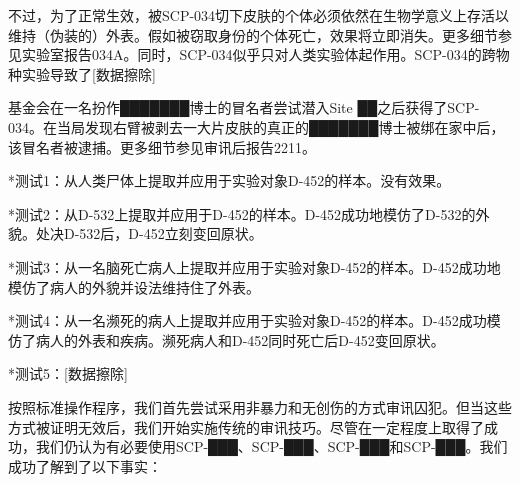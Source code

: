 不过，为了正常生效，被SCP-034切下皮肤的个体必须依然在生物学意义上存活以维持（伪装的）外表。假如被窃取身份的个体死亡，效果将立即消失。更多细节参见实验室报告034A。同时，SCP-034似乎只对人类实验体起作用。SCP-034的跨物种实验导致了{[}数据擦除]

基金会在一名扮作███████博士的冒名者尝试潜入Site ██之后获得了SCP-034。在当局发现右臂被剥去一大片皮肤的真正的███████博士被绑在家中后，该冒名者被逮捕。更多细节参见审讯后报告2211。


*测试1：从人类尸体上提取并应用于实验对象D-452的样本。没有效果。

*测试2：从D-532上提取并应用于D-452的样本。D-452成功地模仿了D-532的外貌。处决D-532后，D-452立刻变回原状。

*测试3：从一名脑死亡病人上提取并应用于实验对象D-452的样本。D-452成功地模仿了病人的外貌并设法维持住了外表。

*测试4：从一名濒死的病人上提取并应用于实验对象D-452的样本。D-452成功模仿了病人的外表和疾病。濒死病人和D-452同时死亡后D-452变回原状。

*测试5：{[}数据擦除]


按照标准操作程序，我们首先尝试采用非暴力和无创伤的方式审讯囚犯。但当这些方式被证明无效后，我们开始实施传统的审讯技巧。尽管在一定程度上取得了成功，我们仍认为有必要使用SCP-███、SCP-███、SCP-███和SCP-███。我们成功了解到了以下事实：


